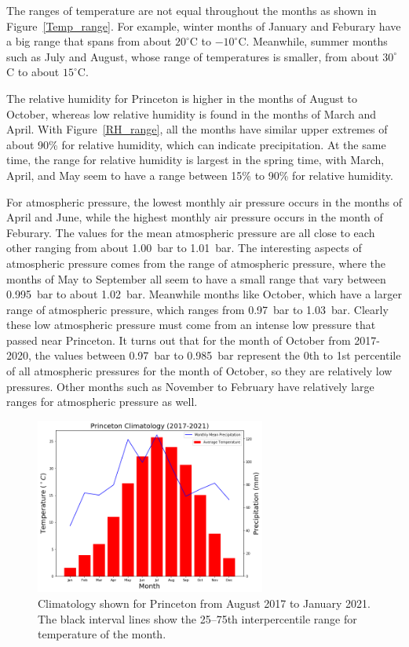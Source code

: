 \documentclass[11pt]{report}
\begin{document}
The ranges of temperature are not equal throughout the months as shown in 
Figure~\ref{Temp_range}. For example, winter months of January and Feburary
have a big range that spans from about $20 ^\circ $C to $-10
^\circ$C. Meanwhile, summer months such as July and August, whose
range of temperatures is smaller, from about $30 ^\circ $C to about $15
^\circ $C.

The relative humidity for Princeton is higher in the months of
August to October, whereas low relative humidity is found in the
months of March and April.  With Figure~\ref{RH_range}, all
the months have similar upper extremes of about 90\% for relative humidity,
which can indicate precipitation. At the same time, the range for relative
humidity is largest in the spring time, with March, April, and May seem to
have a range between 15\% to 90\% for relative humidity. 

For atmospheric pressure, the lowest monthly air pressure occurs in the
months of April and June, while the highest monthly air pressure occurs
in the month of Feburary. The values for the mean atmospheric
pressure are all close to each other ranging from about 1.00~bar to
1.01~bar. The interesting aspects of atmospheric pressure comes from
the range of atmospheric pressure, where the months of May to September all
seem to have a small range that vary between 0.995~bar to about
1.02~bar. Meanwhile months like October, which have a larger range
of atmospheric pressure, which ranges from 0.97~bar to 1.03~bar. Clearly
these low atmospheric pressure must come from an intense low pressure that
passed near Princeton. It turns out that for the month of October from
2017-2020, the values between 0.97~bar to 0.985~bar represent
the 0th to 1st percentile of all atmospheric pressures for the month of
October, so they are relatively low pressures. Other months such as November
to February have relatively large ranges for atmospheric pressure as well.
\clearpage
\begin{figure}[b]
	\centering
	\includegraphics[width=0.675\textwidth]{Figures/Climate1.png}
	\caption[Climatology of temperature and precipitation of Princeton
          (2017--2021)]{\label{Clim1} Climatology shown for Princeton from
          August 2017 to January 2021. The black interval lines show the
          25--75th interpercentile range for temperature of the month.}
\end{figure}
\end{document}

